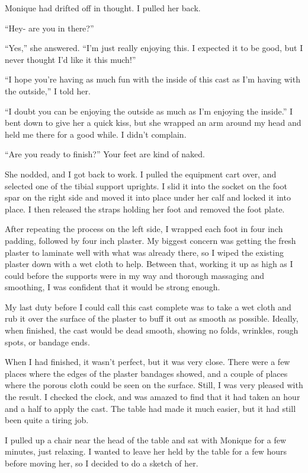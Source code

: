 Monique had drifted off in thought. I pulled her back.

``Hey- are you in there?''

``Yes,'' she answered. ``I'm just really enjoying this. I expected it to be good, but I never
thought I'd like it this much!''

``I hope you're having as much fun with the inside of this cast as I'm having with the
outside,'' I told her.

``I doubt you can be enjoying the outside as much as I'm enjoying the inside.'' I bent down
to give her a quick kiss, but she wrapped an arm around my head and held me there for a good
while. I didn't complain.

``Are you ready to finish?'' Your feet are kind of naked.

She nodded, and I got back to work. I pulled the equipment cart over, and selected one of
the tibial support uprights. I slid it into the socket on the foot spar on the right side and
moved it into place under her calf and locked it into place. I then released the straps holding
her foot and removed the foot plate.

After repeating the process on the left side, I wrapped each foot in four inch padding,
followed by four inch plaster. My biggest concern was getting the fresh plaster to laminate well
with what was already there, so I wiped the existing plaster down with a wet cloth to help.
Between that, working it up as high as I could before the supports were in my way and thorough
massaging and smoothing, I was confident that it would be strong enough.

My last duty before I could call this cast complete was to take a wet cloth and rub it over
the surface of the plaster to buff it out as smooth as possible. Ideally, when finished, the
cast would be dead smooth, showing no folds, wrinkles, rough spots, or bandage ends.

When I had finished, it wasn't perfect, but it was very close. There were a few places
where the edges of the plaster bandages showed, and a couple of places where the porous cloth
could be seen on the surface. Still, I was very pleased with the result. I checked the clock,
and was amazed to find that it had taken an hour and a half to apply the cast. The table had
made it much easier, but it had still been quite a tiring job.

I pulled up a chair near the head of the table and sat with Monique for a few minutes, just
relaxing. I wanted to leave her held by the table for a few hours before moving her, so I
decided to do a sketch of her.

